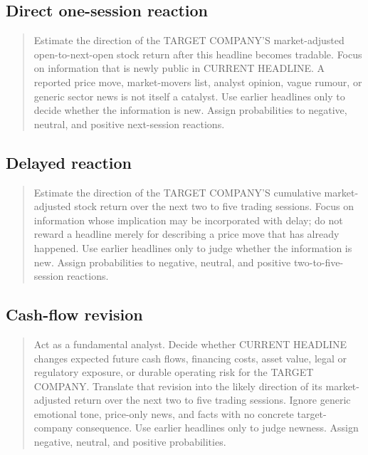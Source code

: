 \subsection*{Direct one-session reaction}

\begin{quote}\small
Estimate the direction of the TARGET COMPANY'S market-adjusted open-to-next-open
stock return after this headline becomes tradable. Focus on information that is
newly public in CURRENT HEADLINE. A reported price move, market-movers list,
analyst opinion, vague rumour, or generic sector news is not itself a catalyst.
Use earlier headlines only to decide whether the information is new. Assign
probabilities to negative, neutral, and positive next-session reactions.
\end{quote}

\subsection*{Delayed reaction}

\begin{quote}\small
Estimate the direction of the TARGET COMPANY'S cumulative market-adjusted stock
return over the next two to five trading sessions. Focus on information whose
implication may be incorporated with delay; do not reward a headline merely for
describing a price move that has already happened. Use earlier headlines only to
judge whether the information is new. Assign probabilities to negative, neutral,
and positive two-to-five-session reactions.
\end{quote}

\subsection*{Cash-flow revision}

\begin{quote}\small
Act as a fundamental analyst. Decide whether CURRENT HEADLINE changes expected
future cash flows, financing costs, asset value, legal or regulatory exposure, or
durable operating risk for the TARGET COMPANY. Translate that revision into the
likely direction of its market-adjusted return over the next two to five trading
sessions. Ignore generic emotional tone, price-only news, and facts with no
concrete target-company consequence. Use earlier headlines only to judge newness.
Assign negative, neutral, and positive probabilities.
\end{quote}


